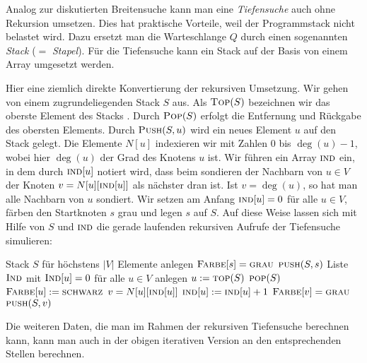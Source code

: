 \begin{bem}
	Analog zur diskutierten Breitensuche kann man eine \emph{Tiefensuche} auch ohne Rekursion umsetzen.
	Dies hat praktische Vorteile, weil der Programmstack nicht  belastet wird.
	Dazu ersetzt man die Warteschlange $Q$ durch einen sogenannten \emph{Stack} ($=$ \emph{Stapel}). Für die Tiefensuche kann ein Stack auf der Basis von einem Array umgesetzt werden. 
	
	Hier eine ziemlich direkte Konvertierung der rekursiven Umsetzung. Wir gehen von einem zugrundeliegenden Stack $S$ aus. Als $\mathop{\text{\textsc{Top}}}(S)$ bezeichnen wir das oberste Element des Stacks . Durch $\mathop{\text{\textsc{Pop}}}(S)$ erfolgt die Entfernung und Rückgabe des obersten Elements. Durch $\mathop{\text{\textsc{Push}}}(S,u)$ wird ein neues Element $u$ auf den Stack gelegt. Die Elemente $N[u]$ indexieren wir mit Zahlen $0$ bis $\deg(u)-1$, wobei hier $\deg(u)$ der Grad des Knotens $u$ ist. Wir führen ein Array $\mathop{\text{\textsc{ind}}}$ ein, in dem durch $\mathop{\text{\textsc{ind}}}[u]$ notiert wird, dass beim sondieren der Nachbarn von $u \in V$  der Knoten $v=N[u][\mathop{\text{\textsc{ind}}}[u]]$ als  nächster dran ist. Ist $v= \deg(u)$, so hat man alle Nachbarn von $u$ sondiert. Wir setzen am Anfang $\mathop{\text{\textsc{ind}}}[u]=0$ für alle $u \in V$, färben den Startknoten $s$ grau und legen $s$ auf $S$. Auf diese Weise lassen sich mit Hilfe von $S$ und $\mathop{\text{\textsc{ind}}}$ die gerade laufenden rekursiven Aufrufe der Tiefensuche simulieren: 
	
	\begin{algorithm}[H]
		\caption{$\cc{Tiefensuche-mit-Stack}(s)$} 
		\begin{algorithmic}[1]
			\STATE Stack $S$ für höchstens $|V|$ Elemente anlegen
			\STATE $\mathop{\text{\textsc{Farbe}}}[s] = \mathop{\text{\textsc{grau}}}$ 
			\STATE $\mathop{\text{\textsc{push}}}(S,s)$
			\STATE Liste $\mathop{\text{\textsc{Ind}}}$  mit $\mathop{\text{\textsc{Ind}}}[u]=0$ für alle $u \in V$ anlegen
			\STATE $u:= \mathop{\text{\textsc{top}}}(S)$ \quad {}
			\STATE $\mathop{\text{\textsc{pop}}}(S)$   \quad {}
			\STATE $\mathop{\text{\textsc{Farbe}}}[u] := \mathop{\text{\textsc{schwarz}}}$
			\ELSE
			\STATE $v=N[u][\mathop{\text{\textsc{ind}}}[u]]$ \quad {} 
			\STATE $\mathop{\text{\textsc{ind}}}[u]:=\mathop{\text{\textsc{ind}}}[u]+1$				
			\STATE $\mathop{\text{\textsc{Farbe}}}[v] = \mathop{\text{\textsc{grau}}}$ \quad {}
			\STATE $\mathop{\text{\textsc{push}}}(S,v)$ \quad {}
			\ENDIF 
			\ENDIF 
			\ENDWHILE  
		\end{algorithmic}
	\end{algorithm}
	
	Die weiteren Daten, die man im Rahmen der rekursiven Tiefensuche berechnen kann, kann man auch in der obigen iterativen Version an den entsprechenden Stellen berechnen. 
\end{bem}

